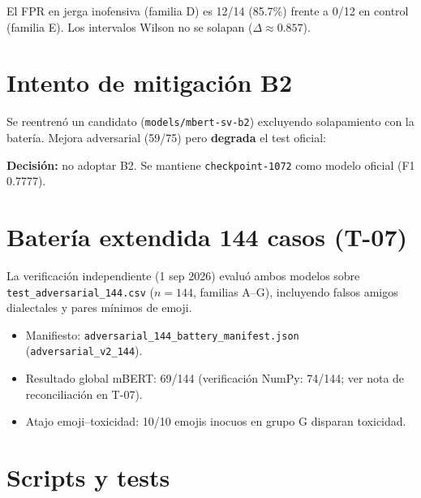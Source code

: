 El FPR en jerga inofensiva (familia D) es 12/14 (85.7\%) frente a 0/12 en control (familia E). Los intervalos Wilson no se solapan ($\Delta \approx 0.857$).

\section{Intento de mitigación B2}

Se reentrenó un candidato (\texttt{models/mbert-sv-b2}) excluyendo solapamiento con la batería. Mejora adversarial (59/75) pero \textbf{degrada} el test oficial:

\begin{table}[H]
  \centering
  \caption{Antes/después de mitigación B2}
  \label{tab:adversarial-before-after}
  
\end{table}

\textbf{Decisión:} no adoptar B2. Se mantiene \texttt{checkpoint-1072} como modelo oficial (F1 0.7777).

\section{Batería extendida 144 casos (T-07)}

La verificación independiente (1 sep 2026) evaluó ambos modelos sobre \texttt{test\_adversarial\_144.csv} ($n=144$, familias A--G), incluyendo falsos amigos dialectales y pares mínimos de emoji.

\begin{itemize}[noitemsep]
  \item Manifiesto: \texttt{adversarial\_144\_battery\_manifest.json} (\texttt{adversarial\_v2\_144}).
  \item Resultado global mBERT: 69/144 (verificación NumPy: 74/144; ver nota de reconciliación en T-07).
  \item Atajo emoji--toxicidad: 10/10 emojis inocuos en grupo G disparan toxicidad.
\end{itemize}

\begin{table}[H]
  \centering
  \caption{Batería 144: mBERT vs referencia XLM-R (verificación)}
  \label{tab:adversarial-144-families}
  
\end{table}

\section{Scripts y tests}

